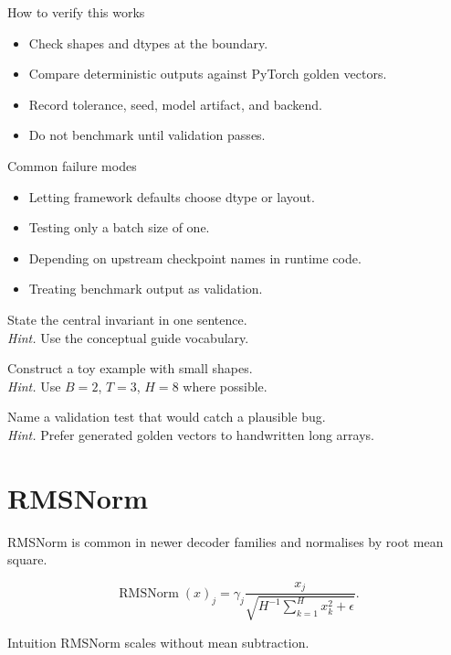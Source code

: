 \begin{verificationbox}{How to verify this works}
\begin{itemize}
\item Check shapes and dtypes at the boundary.
\item Compare deterministic outputs against PyTorch golden vectors.
\item Record tolerance, seed, model artifact, and backend.
\item Do not benchmark until validation passes.
\end{itemize}
\end{verificationbox}

\begin{warningbox}{Common failure modes}
\begin{itemize}
\item Letting framework defaults choose dtype or layout.
\item Testing only a batch size of one.
\item Depending on upstream checkpoint names in runtime code.
\item Treating benchmark output as validation.
\end{itemize}
\end{warningbox}

\begin{chapterexercises}
\item State the central invariant in one sentence.\\
\textit{Hint.} Use the conceptual guide vocabulary.
\item Construct a toy example with small shapes.\\
\textit{Hint.} Use $B=2$, $T=3$, $H=8$ where possible.
\item Name a validation test that would catch a plausible bug.\\
\textit{Hint.} Prefer generated golden vectors to handwritten long arrays.
\end{chapterexercises}

\chapter{RMSNorm}
\label{ch:rmsnorm}
RMSNorm is common in newer decoder families and normalises by root mean square. \citep{zhang2019rmsnorm}

\[
\operatorname{RMSNorm}(x)_j=\gamma_j\frac{x_j}{\sqrt{H^{-1}\sum_{k=1}^{H}x_k^2+\epsilon}}.
\]

\begin{intuitionbox}{Intuition}
RMSNorm scales without mean subtraction.
\end{intuitionbox}

